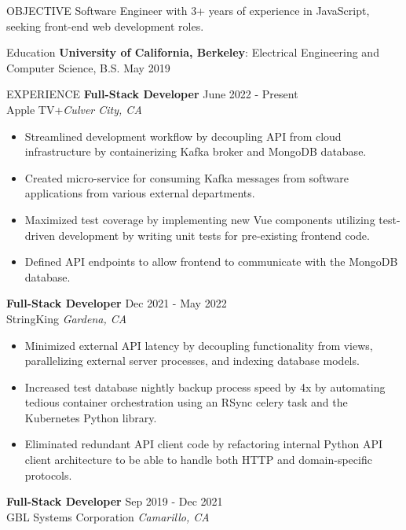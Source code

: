 \documentclass{resume} %
\begin{document}
\begin{rSection}{OBJECTIVE}
{Software Engineer with 3+ years of experience in JavaScript, seeking front-end web development roles.}
\end{rSection}

\begin{rSection}{Education}
{\bf University of California, Berkeley}: Electrical Engineering and Computer Science, B.S. \hfill {May 2019}
\end{rSection}

\begin{rSection}{EXPERIENCE}
\textbf{Full-Stack Developer} \hfill June 2022 - Present\\
Apple TV+\hfill \textit{Culver City, CA}
 \begin{itemize}
    \itemsep -3pt {} 
    \item Streamlined development workflow by decoupling API from cloud infrastructure by containerizing Kafka broker and MongoDB database.
     \item Created micro-service for consuming Kafka messages from software applications from various external departments. 
    \item Maximized test coverage by implementing new Vue components utilizing test-driven development by writing unit tests for pre-existing frontend code.
    \item Defined API endpoints to allow frontend to communicate with the MongoDB database.
 \end{itemize}
\textbf{Full-Stack Developer} \hfill Dec 2021 - May 2022\\
StringKing \hfill \textit{Gardena, CA}
 \begin{itemize}
    \itemsep -3pt {} 
    \item Minimized external API latency by decoupling functionality from views, parallelizing external server processes, and indexing database models.
    \item Increased test database nightly backup process speed by 4x by automating tedious container orchestration using an RSync celery task and the Kubernetes Python library.
    \item Eliminated redundant API client code by refactoring internal Python API client architecture to be able to handle both HTTP and domain-specific protocols.
 \end{itemize}
 \textbf{Full-Stack Developer} \hfill Sep 2019 - Dec 2021\\
GBL Systems Corporation \hfill \textit{Camarillo, CA}
 \begin{itemize}

\end{itemize}
\end{rSection}
\end{document}
